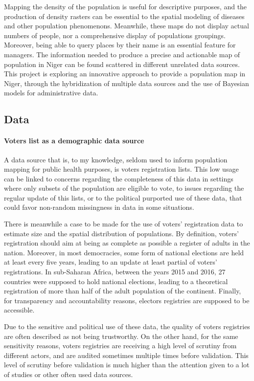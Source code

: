 Mapping the density of the population is useful for descriptive purposes, and the production of density rasters can be essential to the spatial modeling of diseases and other population phenomenons. Meanwhile, these maps do not display actual numbers of people, nor a comprehensive display of populations groupings. Moreover, being able to query places by their name is an essential feature for managers. The information needed to produce a precise and actionable map of population in Niger can be found scattered in different unrelated data sources. This  project is exploring an innovative approach to provide a population map in Niger, through the hybridization of multiple data sources and the use of Bayesian models for administrative data.

\subsection{Data}

\paragraph{Voters list as a demographic data source} A data source that is, to my knowledge, seldom used to inform population mapping for public health purposes, is voters registration lists. This low usage can be linked to concerns regarding the completeness of this data in settings where only subsets of the population are eligible to vote, to issues regarding the regular update of this lists, or to the political purported use of these data, that could favor non-random missingness in data in some situations.

There is meanwhile a case to be made for the use of voters' registration data to estimate size and the spatial distribution of populations. By definition, voters' registration should aim at being as complete as possible a register of adults in the nation. Moreover, in most democracies, some form of national elections are held at least  every five years, leading to an update at least partial of voters' registrations. In sub-Saharan Africa, between the years 2015 and 2016, 27 countries were supposed to hold national elections, leading to a theoretical registration of more than half of the adult population of the continent. Finally, for transparency and accountability reasons, electors registries are supposed to be accessible.

Due to the sensitive and political use of these data, the quality of voters registries are often described as not being trustworthy. On the other hand, for the same sensitivity reasons, voters registries are receiving a high level of scrutiny from different actors, and are audited sometimes multiple times before validation. This level of scrutiny before validation is much higher than the attention given to a lot of studies or other often used data sources.

